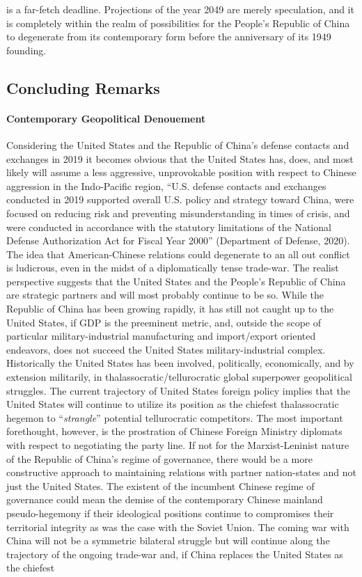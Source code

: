 \documentclass[12pt]{article}
\begin{document}
is a far-fetch deadline. Projections of the year 2049 are merely speculation, and it is completely within the realm of possibilities for the People's Republic of China to degenerate from its contemporary form before the  anniversary of its 1949 founding. 
 
\begin{center}
  \section{Concluding Remarks}
\end{center}
\paragraph{Contemporary Geopolitical Denouement} Considering the United States and the Republic of China's defense contacts and exchanges in 2019 it becomes obvious that the United States has, does, and most likely will assume a less aggressive, unprovokable position with respect to Chinese aggression in the Indo-Pacific region, “U.S. defense contacts and exchanges conducted in 2019 supported overall U.S. policy and strategy toward China, were focused on reducing risk and preventing misunderstanding in times of crisis, and  were  conducted  in  accordance  with  the  statutory  limitations  of  the  National  Defense Authorization Act for Fiscal Year 2000” (Department of Defense, 2020). The idea that American-Chinese relations could degenerate to an all out conflict is ludicrous, even in the midst of a diplomatically tense trade-war. The realist perspective suggests that the United States and the People's Republic of China are strategic partners and will most probably continue to be so. While the Republic of China has been growing rapidly, it has still not caught up to the United States, if GDP is the preeminent metric, and, outside the scope of particular military-industrial manufacturing and import/export oriented endeavors, does not succeed the United States military-industrial complex. Historically the United States has been involved, politically, economically, and by extension militarily, in thalassocratic/tellurocratic global superpower geopolitical struggles. The current trajectory of United States foreign policy implies that the United States will continue to utilize its position as the chiefest thalassocratic hegemon to “\emph{strangle}” potential tellurocratic competitors. The most important forethought, however, is the prostration of Chinese Foreign Ministry diplomats with respect to negotiating the party line. If not for the Marxist-Leninist nature of the Republic of China's regime of governance, there would be a more constructive approach to maintaining relations with partner nation-states and not just the United States. The existent of the incumbent Chinese regime of governance could mean the demise of the contemporary Chinese mainland pseudo-hegemony if their ideological positions continue to compromises their territorial integrity as was the case with the Soviet Union. The coming war with China will not be a symmetric bilateral struggle but will continue along the trajectory of the ongoing trade-war and, if China replaces the United States as the chiefest 
\end{document}
